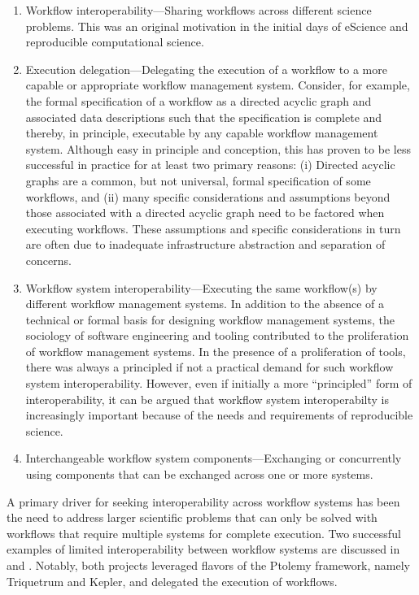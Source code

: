 \begin{enumerate}

\item Workflow interoperability---Sharing workflows across different science
problems. This was an original motivation in the initial days of eScience  and
reproducible computational science. 

\item Execution delegation---Delegating the execution of a workflow to a more
capable or appropriate workflow management system. Consider, for example, the
formal specification of a workflow as a directed acyclic graph and associated
data descriptions such that the specification is complete and thereby, in
principle, executable by any capable workflow management system.  Although
easy in principle and conception, this has proven to be less successful
in practice for at least two primary reasons: (i) Directed acyclic graphs are a
common, but not universal, formal specification of some workflows, and (ii)
many specific considerations and assumptions beyond those associated with a
directed acyclic graph need to be factored when executing workflows. These
assumptions and specific considerations in turn are often due to inadequate
infrastructure abstraction and separation of concerns.

\item Workflow system interoperability---Executing the same workflow(s) by
different workflow management systems. In addition to the absence of a
technical or formal basis for designing workflow management systems, the
sociology of software engineering and tooling contributed to the proliferation
of workflow management systems. In the presence of a proliferation of tools,
there was always a principled if not a practical demand for such workflow
system interoperability. However, even if initially a  more  ``principled'' form
of interoperability, it can be argued that workflow system interoperabilty is
increasingly important because of the needs and requirements of reproducible
science.

\item Interchangeable workflow system components---Exchanging or
concurrently using components that can be exchanged across
one or more systems.

\end{enumerate} 

A primary driver for seeking interoperability across workflow systems
has been the need to address larger scientific problems that can only be
solved with workflows that require multiple systems for complete execution.
Two successful examples of limited interoperability between workflow systems
are discussed in \cite{brooks_triquetrum:_2015} and
\cite{mandal_integrating_2007}. Notably, both projects leveraged flavors of
the Ptolemy framework, namely Triquetrum and Kepler, and delegated the
execution of workflows. 






